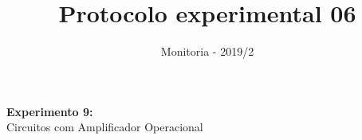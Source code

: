 \documentclass[10pt]{article}
\author{Monitoria - 2019/2}
\title{Protocolo experimental 06}
\numberwithin{table}{section}
\begin{document}
\begin{center}
\vspace*{.03cm}
\Large\textbf{Experimento 9:}\\ %
\Large{Circuitos com Amplificador Operacional}
\end{center}
\justify







\end{document}
